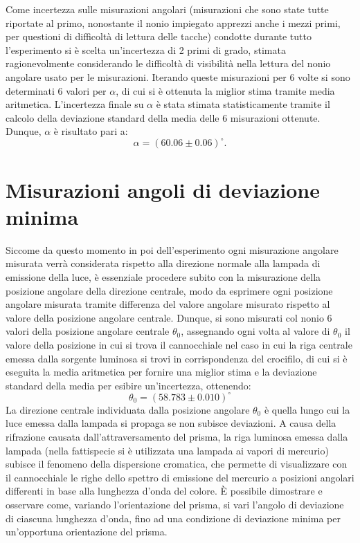\documentclass[a4paper,12pt]{article}
\begin{document}
Come incertezza sulle misurazioni angolari (misurazioni che sono state tutte riportate al primo, nonostante il nonio impiegato apprezzi anche i mezzi primi, per questioni di difficoltà di lettura delle tacche) condotte durante tutto l’esperimento si è scelta un’incertezza di 2 primi di grado, stimata ragionevolmente considerando le difficoltà di visibilità nella lettura del nonio angolare usato per le misurazioni. 
Iterando queste misurazioni per 6 volte si sono determinati 6 valori per \( \alpha \), di cui si è ottenuta la miglior stima tramite media aritmetica. L’incertezza finale su \( \alpha \) è stata stimata statisticamente tramite il calcolo della deviazione standard della media delle 6 misurazioni ottenute.
Dunque, \( \alpha \) è risultato pari a:
\[\alpha = (60.06 \pm 0.06)^\circ.\] 

\section{Misurazioni angoli di deviazione minima}
Siccome da questo momento in poi dell’esperimento ogni misurazione angolare misurata verrà considerata rispetto alla direzione normale alla lampada di emissione della luce, è essenziale procedere subito con la misurazione della posizione angolare della direzione centrale, modo da esprimere ogni posizione angolare misurata tramite differenza del valore angolare misurato rispetto al valore della posizione angolare centrale.
Dunque, si sono misurati col nonio 6 valori della posizione angolare centrale \( \theta_0 \), assegnando ogni volta al valore di \( \theta_0 \) il valore della posizione in cui si trova il cannocchiale nel caso in cui la riga centrale emessa dalla sorgente luminosa si trovi in corrispondenza del crocifilo, di cui si è eseguita la media aritmetica per fornire una miglior stima e la deviazione standard della media per esibire un’incertezza, ottenendo:
\[
\theta_0 = (58.783 \pm 0.010)^\circ
\]
La direzione centrale individuata dalla posizione angolare \( \theta_0 \) è quella lungo cui la luce emessa dalla lampada si propaga se non subisce deviazioni.
A causa della rifrazione causata dall’attraversamento del prisma, la riga luminosa emessa dalla lampada (nella fattispecie si è utilizzata una lampada ai vapori di mercurio) subisce il fenomeno della dispersione cromatica, che permette di visualizzare con il cannocchiale le righe dello spettro di emissione del mercurio a posizioni angolari differenti in base alla lunghezza d’onda del colore.
È possibile dimostrare e osservare come, variando l’orientazione del prisma, si vari l’angolo di deviazione di ciascuna lunghezza d’onda, fino ad una condizione di deviazione minima per un’opportuna orientazione del prisma.
\end{document}
